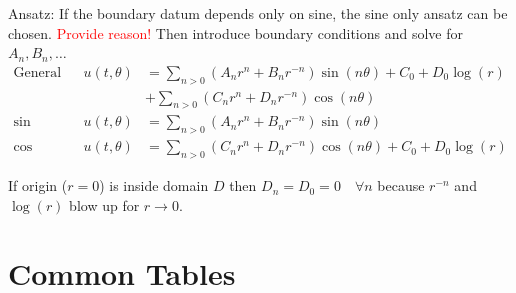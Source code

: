 \documentclass[10pt,landscape]{scrartcl}
\begin{document}
\begin{multicols*}{2}
  Ansatz: If the boundary datum depends only on sine, the sine only ansatz can be chosen. \textcolor{red}{Provide reason!} Then introduce boundary conditions and solve for $A_n,B_n, \dots$
  \begin{align*}
    \text{General} && u(t,\theta) &= \sum_{n>0}\left(A_nr^n+B_nr^{-n}\right)\sin(n\theta) + C_0 + D_0\log(r) \\
                               && &+ \sum_{n>0}\left(C_nr^n+D_nr^{-n}\right)\cos(n\theta) \\
    \text{sin only} && u(t,\theta) &= \sum_{n>0}\left(A_nr^n+B_nr^{-n}\right)\sin(n\theta) \\
    \text{cos only} && u(t,\theta) &= \sum_{n>0}\left(C_nr^n+D_nr^{-n}\right)\cos(n\theta) + C_0 + D_0\log(r)
  \end{align*}

  If origin ($r=0$) is inside domain $D$ then $D_n=D_0=0 \quad \forall n$ because $r^{-n}$ and $\log(r)$ blow up for $r\to0$.


% 
\vfill\null
\columnbreak
\section{Common Tables}

\end{multicols*}
\end{document}
